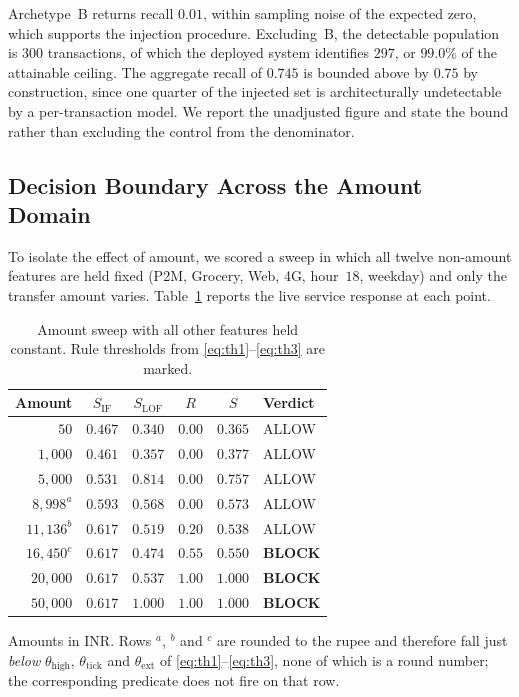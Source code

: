 \documentclass[conference]{IEEEtran}
\begin{document}
Archetype~B returns recall $0.01$, within sampling noise of the
expected zero, which supports the injection procedure. Excluding~B,
the detectable population is $300$ transactions, of which the deployed
system identifies $297$, or $99.0\%$ of the attainable ceiling. The
aggregate recall of $0.745$ is bounded above by $0.75$ by
construction, since one quarter of the injected set is architecturally
undetectable by a per-transaction model. We report the unadjusted
figure and state the bound rather than excluding the control from the
denominator.

\subsection{Decision Boundary Across the Amount Domain}
\label{subsec:edge}

To isolate the effect of amount, we scored a sweep in which all twelve
non-amount features are held fixed (P2M, Grocery, Web, 4G, hour~$18$,
weekday) and only the transfer amount varies.
Table~\ref{tab:sweep} reports the live service response at each point.

\begin{table}[t]
\centering
\caption{Amount sweep with all other features held constant. Rule
thresholds from \eqref{eq:th1}--\eqref{eq:th3} are marked.}
\label{tab:sweep}
\renewcommand{\arraystretch}{1.2}
\footnotesize
\setlength{\tabcolsep}{4pt}
\begin{tabular}{@{}rccccl@{}}
\toprule
\textbf{Amount} & $S_{\mathrm{IF}}$ & $S_{\mathrm{LOF}}$ & $R$ & $S$ & \textbf{Verdict} \\
\midrule
$50$            & $0.467$ & $0.340$ & $0.00$ & $0.365$ & ALLOW \\
$1{,}000$       & $0.461$ & $0.357$ & $0.00$ & $0.377$ & ALLOW \\
$5{,}000$       & $0.531$ & $0.814$ & $0.00$ & $0.757$ & ALLOW \\
$8{,}998^{a}$   & $0.593$ & $0.568$ & $0.00$ & $0.573$ & ALLOW \\
$11{,}136^{b}$  & $0.617$ & $0.519$ & $0.20$ & $0.538$ & ALLOW \\
$16{,}450^{c}$  & $0.617$ & $0.474$ & $0.55$ & $0.550$ & \textbf{BLOCK} \\
$20{,}000$      & $0.617$ & $0.537$ & $1.00$ & $1.000$ & \textbf{BLOCK} \\
$50{,}000$      & $0.617$ & $1.000$ & $1.00$ & $1.000$ & \textbf{BLOCK} \\
\bottomrule
\end{tabular}

\vspace{2pt}
{\footnotesize\raggedright
Amounts in INR. Rows $^{a}$, $^{b}$ and $^{c}$ are rounded to the
rupee and therefore fall just \emph{below}
$\theta_{\mathrm{high}}$, $\theta_{\mathrm{tick}}$ and
$\theta_{\mathrm{ext}}$ of \eqref{eq:th1}--\eqref{eq:th3}, none of
which is a round number; the corresponding predicate does not fire on
that row.\par}
\end{table}
\end{document}
